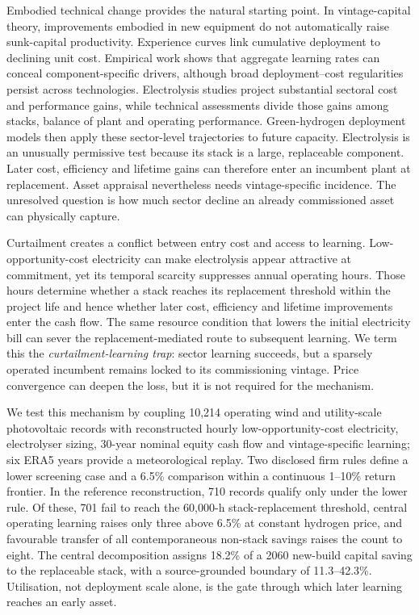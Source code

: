 \documentclass[11pt,a4paper]{article}
\begin{document}
Embodied technical change provides the natural starting point. In vintage-capital theory, improvements embodied in new equipment do not automatically raise sunk-capital productivity\cite{solow1960}. Experience curves link cumulative deployment to declining unit cost\cite{wright1936,arrow1962,mcdonald2001}. Empirical work shows that aggregate learning rates can conceal component-specific drivers\cite{nemet2006,ferioli2009,rubin2015}, although broad deployment--cost regularities persist across technologies\cite{farmer2016,way2022}. Electrolysis studies project substantial sectoral cost and performance gains\cite{schmidt2017,brandt2024,song2021,glenk2023}, while technical assessments divide those gains among stacks, balance of plant and operating performance\cite{irena2020,doe2024,worldbank2026}. Green-hydrogen deployment models then apply these sector-level trajectories to future capacity\cite{odenweller2022,zeyen2023,odenweller2025}. Electrolysis is an unusually permissive test because its stack is a large, replaceable component. Later cost, efficiency and lifetime gains can therefore enter an incumbent plant at replacement. Asset appraisal nevertheless needs vintage-specific incidence. The unresolved question is how much sector decline an already commissioned asset can physically capture.

Curtailment creates a conflict between entry cost and access to learning\cite{glenk2019,fan2025,nea2025hydrogen}. Low-opportunity-cost electricity can make electrolysis appear attractive at commitment, yet its temporal scarcity suppresses annual operating hours. Those hours determine whether a stack reaches its replacement threshold within the project life and hence whether later cost, efficiency and lifetime improvements enter the cash flow. The same resource condition that lowers the initial electricity bill can sever the replacement-mediated route to subsequent learning. We term this the \emph{curtailment-learning trap}: sector learning succeeds, but a sparsely operated incumbent remains locked to its commissioning vintage. Price convergence can deepen the loss, but it is not required for the mechanism.

We test this mechanism by coupling 10,214 operating wind and utility-scale photovoltaic records with reconstructed hourly low-opportunity-cost electricity, electrolyser sizing, 30-year nominal equity cash flow and vintage-specific learning; six ERA5 years provide a meteorological replay. Two disclosed firm rules define a lower screening case and a 6.5\% comparison within a continuous 1--10\% return frontier\cite{changyuan2026,chinabond2026,huadian2025}. In the reference reconstruction, 710 records qualify only under the lower rule. Of these, 701 fail to reach the 60,000-h stack-replacement threshold, central operating learning raises only three above 6.5\% at constant hydrogen price, and favourable transfer of all contemporaneous non-stack savings raises the count to eight. The central decomposition assigns 18.2\% of a 2060 new-build capital saving to the replaceable stack, with a source-grounded boundary of 11.3--42.3\%. Utilisation, not deployment scale alone, is the gate through which later learning reaches an early asset.
\end{document}
